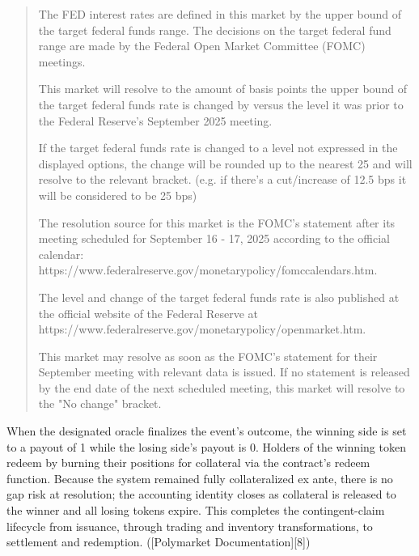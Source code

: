 


\begin{quote}
  {
    \raggedright
    The FED interest rates are defined in this market by the upper bound of the target federal funds range. The decisions on the target federal fund range are made by the Federal Open Market Committee (FOMC) meetings.

    This market will resolve to the amount of basis points the upper bound of the target federal funds rate is changed by versus the level it was prior to the Federal Reserve's September 2025 meeting.

    If the target federal funds rate is changed to a level not expressed in the displayed options, the change will be rounded up to the nearest 25 and will resolve to the relevant bracket. (e.g. if there's a cut/increase of 12.5 bps it will be considered to be 25 bps)

    The resolution source for this market is the FOMC’s statement after its meeting scheduled for September 16 - 17, 2025 according to the official calendar:
    https://www.federalreserve.gov/monetarypolicy/fomccalendars.htm.

    The level and change of the target federal funds rate is also published at the official website of the Federal Reserve at
    https://www.federalreserve.gov/monetarypolicy/openmarket.htm.

    This market may resolve as soon as the FOMC’s statement for their September meeting with relevant data is issued. If no statement is released by the end date of the next scheduled meeting, this market will resolve to the "No change" bracket. 
  }
\end{quote}

When the designated oracle finalizes the event’s outcome, the winning side is set to a payout of 1 while the losing side’s payout is 0. Holders of the winning token redeem by burning their positions for collateral via the contract’s redeem function. Because the system remained fully collateralized ex ante, there is no gap risk at resolution; the accounting identity closes as collateral is released to the winner and all losing tokens expire. This completes the contingent-claim lifecycle from issuance, through trading and inventory transformations, to settlement and redemption. ([Polymarket Documentation][8])


